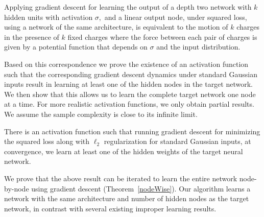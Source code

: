 \begin{theorem}
Applying gradient descent for learning the output of a depth two network
with $k$ hidden units with activation $\sigma,$ and a linear output
node, under squared loss, using a network of the same architecture,
is equivalent to the motion of $k$ charges in the presence of $k$ fixed charges where the force between each pair of charges is given by a potential function that depends on $\sigma$ and the input distribution.  \end{theorem}
%
Based on this correspondence we  prove the existence of an
activation function such that the corresponding gradient descent
dynamics under standard Gaussian inputs result in learning at least
one of the hidden nodes in the target network. We then show that this
allows us to learn the complete target network one node at a time. For more realistic activation functions, we only obtain
partial results. We assume the sample complexity
is close to its infinite limit.
%

%
\begin{theorem}
There is an activation function such that running gradient
  descent for minimizing the squared loss along with $\ell_2$
  regularization for standard Gaussian inputs, at convergence, 
  we learn at least one of
  the hidden weights of the target neural network.
\end{theorem}
%
We  prove that the above result can be iterated to learn the entire network node-by-node using gradient descent (Theorem~\ref{nodeWise}).  Our algorithm learns a network with the same architecture and number of hidden nodes as the target network, 
in contrast with several existing improper learning results.

